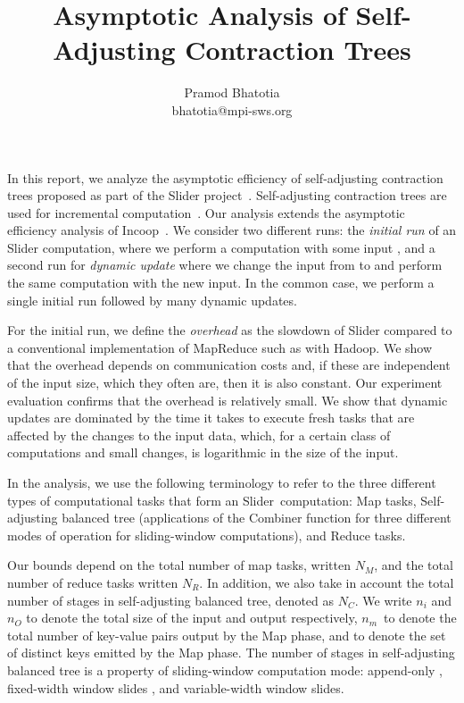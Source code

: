 \documentclass{article}
\newcommand{\projecttitle}{Slider\xspace}
\newcommand{\ninput}{\ensuremath{n_i}\xspace}
\newcommand{\noutput}{\ensuremath{n_O}\xspace}
\newcommand{\nmap}{\ensuremath{N_M}\xspace}
\newcommand{\nred}{\ensuremath{N_R}\xspace}
\newcommand{\ncon}{\ensuremath{N_C}\xspace}
\newcommand{\nkeyvaluemap}{\ensuremath{n_{m}}}
\begin{document}
\date{}
\title{Asymptotic Analysis of Self-Adjusting Contraction Trees} 
\author{Pramod Bhatotia\\bhatotia@mpi-sws.org}





\maketitle
\thispagestyle{empty}
\pagestyle{empty}



	
In this report, we analyze the asymptotic efficiency of self-adjusting contraction trees proposed as part of the \projecttitle project~\cite{slider, contraction-tree}.  Self-adjusting contraction trees are used for incremental computation~\cite{Bhatotia15,  ithreads, shredder, incApprox}. Our analysis extends the asymptotic efficiency analysis of Incoop~\cite{incoop-hotcloud, incoop}. We consider two
different runs: the {\em initial run} of an \projecttitle computation,
where we perform a computation with some input , and a second
run for {\em dynamic update} where we change the input from  to
 and perform the same computation with the new input.  In the
common case, we perform a single initial run followed by many dynamic
updates.


For the initial run, we define the {\em overhead} as the slowdown of
\projecttitle compared to a conventional implementation of MapReduce
such as with Hadoop.  We show that the overhead depends on
communication costs and, if these are independent of
the input size, which they often are, then it is also constant.  Our
experiment evaluation confirms that the overhead is relatively
small.  We show that dynamic updates are dominated by the time it
takes to execute fresh tasks that are affected by the changes to the
input data, which, for a certain class of computations and small
changes, is logarithmic in the size of the input.

In the analysis, we use the following terminology to refer to the
three different types of computational tasks that form an
\projecttitle~computation: Map tasks, Self-adjusting balanced tree (applications
of the Combiner function for three different modes of operation for sliding-window computations), and Reduce tasks.

Our bounds depend on the total number of map tasks, written
\nmap, and the total number of reduce tasks written \nred. In addition, we also
take in account the total number of stages in self-adjusting balanced tree,
denoted as \ncon. We write
\ninput and \noutput to denote the total size of the input and output
respectively, \nkeyvaluemap~to denote the total number of key-value
pairs output by the Map phase, and  to denote the set of
distinct keys emitted by the Map phase. The number of stages in self-adjusting
balanced tree is a property of sliding-window computation mode: append-only
, fixed-width window slides
, and
variable-width window slides.
\end{document}
